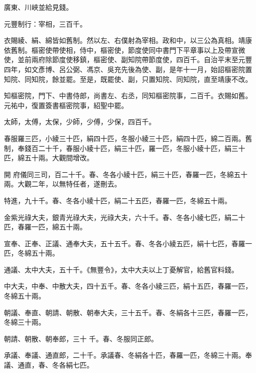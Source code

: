 \begin{pinyinscope}
 廣東、川峽並給見錢。



 元豐制行：宰相，三百千。



 衣賜綾、絹、綿皆如舊制。然以左、右僕射為宰相。政和中，以三公為真相。靖康依舊制。樞密使帶使相，侍中，樞密使，節度使同中書門下平章事以上及帶宣微使，並前兩府除節度使移鎮，樞密使、副知院帶節度使，四百千。自治平末至元豐四年，如文彥博、呂公弼、馮京、吳充先後為使、副，是年十一月，始詔樞密院置知院、同知院，餘並罷。至是，既罷使、副，只置知院、同知院，直至靖康不改。



 知樞密院，門下、中書侍郎，尚書左、右丞，同知樞密院事，二百千。衣賜如舊。元祐中，復置簽書樞密院事，紹聖中罷。



 太師，太傅，太保，少師，少傅，少保，四百千。



 春服羅三匹，小綾三十匹，絹四十匹，冬服小綾三十匹，絹四十匹，綿二百兩。舊制，奉錢百二十千，春服小綾十匹，絹三十匹，羅一匹，冬服小綾十匹，絹三十匹，綿五十兩。大觀間增改。



 開
 府儀同三司，百二十千。春、冬各小綾十匹，絹三十匹，春羅一匹，冬綿五十兩。大觀二年，以無特任者，遂刪去。



 特進，九十千。春、冬各小綾十匹，絹二十五匹，春羅一匹，冬綿五十兩。



 金紫光祿大夫，銀青光祿大夫，光祿大夫，六十千。春、冬各小綾七匹，絹二十匹，春羅一匹，綿五十兩。



 宣奉、正奉、正議、通奉大夫，五十五千。春、冬各小綾五匹，絹十七匹，春羅一匹，冬綿五十兩。



 通議、太中大夫，五十千。《無豐令》，太中大夫以上丁憂解官，給舊官料錢。



 中大夫，中奉、中散大夫，四十五千。春、冬各小綾三匹，絹十五匹，春羅一匹，冬綿五十兩。



 朝議、奉直、朝請、朝散、朝奉大夫，三十五千。春、冬絹各十三匹，春羅一匹，冬綿三十兩。



 朝請、朝散、朝奉郎，三十
 千。春、冬服同正郎。



 承議、奉議、通直郎，二十千。承議春、冬絹各十匹，春羅一匹，冬綿三十兩。奉議、通直，春、冬各絹七匹。




\end{pinyinscope}
